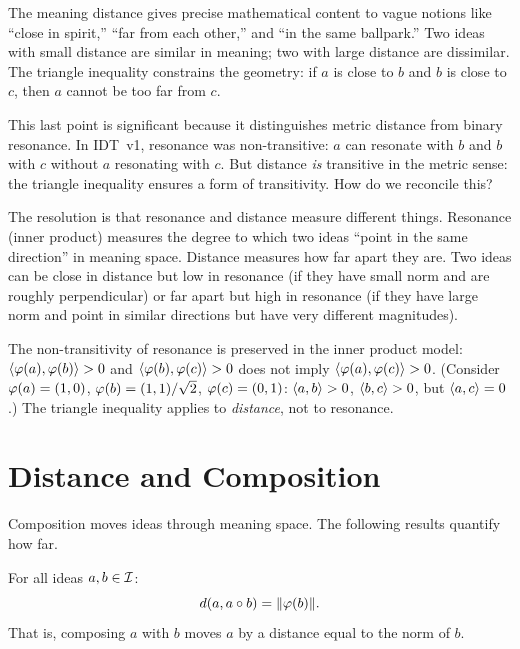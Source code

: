 \begin{interpretation}
\label{interp:proximity}
The meaning distance gives precise mathematical content to vague notions like
``close in spirit,'' ``far from each other,'' and ``in the same ballpark.'' Two
ideas with small distance are similar in meaning; two with large distance are
dissimilar. The triangle inequality constrains the geometry: if $a$ is close to
$b$ and $b$ is close to $c$, then $a$ cannot be too far from $c$.

This last point is significant because it distinguishes metric distance from
binary resonance. In IDT~v1, resonance was non-transitive: $a$ can resonate
with $b$ and $b$ with $c$ without $a$ resonating with $c$. But distance
\emph{is} transitive in the metric sense: the triangle inequality ensures a
form of transitivity. How do we reconcile this?

The resolution is that resonance and distance measure different things. Resonance
(inner product) measures the degree to which two ideas ``point in the same
direction'' in meaning space. Distance measures how far apart they are. Two
ideas can be close in distance but low in resonance (if they have small norm
and are roughly perpendicular) or far apart but high in resonance (if they have
large norm and point in similar directions but have very different magnitudes).

The non-transitivity of resonance is preserved in the inner product model:
$\langle \varphi(a), \varphi(b) \rangle > 0$ and $\langle \varphi(b), \varphi(c) \rangle > 0$ does not
imply $\langle \varphi(a), \varphi(c) \rangle > 0$. (Consider $\varphi(a) = (1, 0)$,
$\varphi(b) = (1, 1)/\sqrt{2}$, $\varphi(c) = (0, 1)$: $\langle a, b \rangle > 0$,
$\langle b, c \rangle > 0$, but $\langle a, c \rangle = 0$.) The triangle inequality applies to
\emph{distance}, not to resonance.
\end{interpretation}


\section{Distance and Composition}

Composition moves ideas through meaning space. The following results quantify
how far.

\begin{theorem}
\label{thm:displacement}
For all ideas $a, b \in \mathcal{I}$:
\[
  d(a, a \circ b) = \lVert \varphi(b) \rVert.
\]
That is, composing $a$ with $b$ moves $a$ by a distance equal to the norm of
$b$.
\end{theorem}

